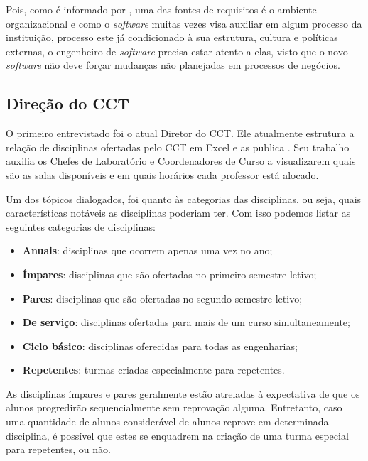 Pois, como é informado por , uma das fontes de requisitos é o ambiente organizacional e como o \textit{software} muitas vezes visa auxiliar em algum processo da instituição, processo este já condicionado à sua estrutura, cultura e políticas externas, o engenheiro de \textit{software} precisa estar atento a elas, visto que o novo \textit{software} não deve forçar mudanças não planejadas em processos de negócios.

\subsection{Direção do CCT} \label{ssec:3_Diretor} %

O primeiro entrevistado foi o atual Diretor do CCT. Ele atualmente estrutura a relação de disciplinas ofertadas pelo CCT em Excel e as publica . Seu trabalho auxilia os Chefes de Laboratório e Coordenadores de Curso a visualizarem quais são as salas disponíveis e em quais horários cada professor está alocado.

Um dos tópicos dialogados, foi quanto às categorias das disciplinas, ou seja, quais características notáveis as disciplinas poderiam ter. Com isso podemos listar as seguintes categorias de disciplinas:

\begin{itemize}
  \item \textbf{Anuais}: disciplinas que ocorrem apenas uma vez no ano;
  \item \textbf{Ímpares}: disciplinas que são ofertadas no primeiro semestre letivo;
  \item \textbf{Pares}: disciplinas que são ofertadas no segundo semestre letivo;
  \item \textbf{De serviço}: disciplinas ofertadas para mais de um curso simultaneamente;
  \item \textbf{Ciclo básico}: disciplinas oferecidas para todas as engenharias;
  \item \textbf{Repetentes}: turmas criadas especialmente para repetentes.
\end{itemize}

As disciplinas ímpares e pares geralmente estão atreladas à expectativa de que os alunos progredirão sequencialmente sem reprovação alguma. Entretanto, caso uma quantidade de alunos considerável de alunos reprove em determinada disciplina, é possível que estes se enquadrem na criação de uma turma especial para repetentes, ou não.

